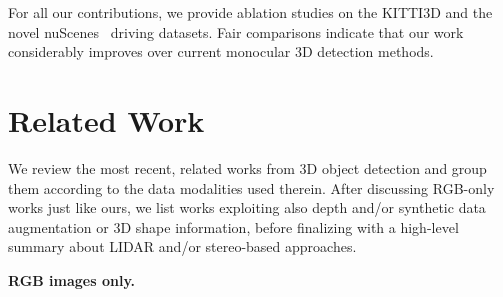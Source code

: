\documentclass[10pt,twocolumn,letterpaper]{article}
\renewcommand{\paragraph}[1]{

        \vspace{3pt}
	\noindent\textbf{#1}}
\begin{document}
For all our contributions, we provide ablation studies on the KITTI3D and the novel nuScenes~\cite{Cae+19} driving datasets. Fair comparisons indicate that our work considerably improves over current monocular 3D detection methods.

\section{Related Work}
We review the most recent, related works from 3D object detection and group them according to the data modalities used therein. After discussing RGB-only works just like ours, we list works exploiting also depth and/or synthetic data augmentation or 3D shape information, before finalizing with a high-level summary about LIDAR and/or stereo-based approaches.

\paragraph{RGB images only.} 
\end{document}
